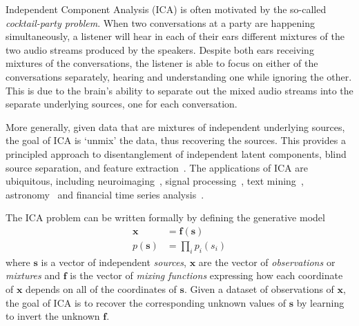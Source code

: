 Independent Component Analysis (ICA) is often motivated by the so-called \emph{cocktail-party problem}.
When two conversations at a party are happening simultaneously, a listener will hear in each of their ears different mixtures of the two audio streams produced by the speakers.
Despite both ears receiving mixtures of the conversations, the listener is able to focus on either of the conversations separately, hearing and understanding one while ignoring the other.
This is due to the brain's ability to separate out the mixed audio streams into the separate underlying sources, one for each conversation.

More generally, given data that are mixtures of independent underlying sources, the goal of ICA is `unmix' the data, thus recovering the sources.
This provides a principled approach to disentanglement of independent latent components, blind source separation, and feature extraction~\citep{hyvarinen2000independent}.
The applications of ICA are ubiquitous, including neuroimaging~\citep{mckeown1998independent}, signal processing~\citep{sawada2003direction}, text mining~\citep{honkela2010wordica}, astronomy~\citep{nuzillard2000blind} and financial time series analysis~\citep{oja2000independent}.

The ICA problem can be written formally by defining the generative model
\begin{align}
\bm{x} &= \bm{f}(\bm{s}) \label{eqn:ica-basic-1}\\
p(\bm{s}) &= \prod_{i} p_i(s_i) \label{eqn:ica-basic-2}
\end{align}
where $\bm{s}$ is a vector of independent \emph{sources}, $\bm{x}$ are the vector of \emph{observations} or \emph{mixtures} and $\bm{f}$ is the vector of \emph{mixing functions} expressing how each coordinate of $\bm{x}$ depends on all of the coordinates of $\bm{s}$. 
Given a dataset of observations of $\bm{x}$, the goal of ICA is to recover the corresponding unknown values of $\bm{s}$ by learning to invert the unknown $\bm{f}$.

